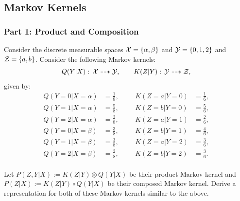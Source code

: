 \subsection{Markov Kernels}

\subsubsection*{Part 1: Product and Composition}

Consider the discrete measurable spaces $\mathcal{X}=\{\alpha,\beta\}$ and $\mathcal{Y}=\{0,1,2\}$ and $\mathcal{Z}=\{a,b\}$.
Consider the following Markov kernels:
\[ Q(Y|X):\, \mathcal{X} \dashrightarrow \mathcal{Y}, \qquad K(Z|Y):\, \mathcal{Y} \dashrightarrow \mathcal{Z},  \]
given by:
\begin{align*}
    Q(Y=0|X=\alpha) &= \frac{1}{8}, &&& K(Z=a|Y=0) &= \frac{1}{6}, \\
    Q(Y=1|X=\alpha) &= \frac{5}{8}, &&& K(Z=b|Y=0) &= \frac{5}{6}, \\
    Q(Y=2|X=\alpha) &=\frac{2}{8}, &&& K(Z=a|Y=1) &= \frac{2}{6}, \\
    Q(Y=0|X=\beta) &= \frac{3}{8}, &&& K(Z=b|Y=1) &= \frac{4}{6},\\
    Q(Y=1|X=\beta) &= \frac{3}{8}, &&& K(Z=a|Y=2) &= \frac{3}{6},\\
    Q(Y=2|X=\beta) &= \frac{2}{8}, &&& K(Z=b|Y=2) &= \frac{3}{6}.\\
\end{align*}

Let $P(Z,Y|X) := K(Z|Y) \otimes Q(Y|X)$ be their product Markov kernel and $P(Z|X):=K(Z|Y) \circ Q(Y|X)$ be their composed Markov kernel.
Derive a representation for both of these Markov kernels similar to the above. %


